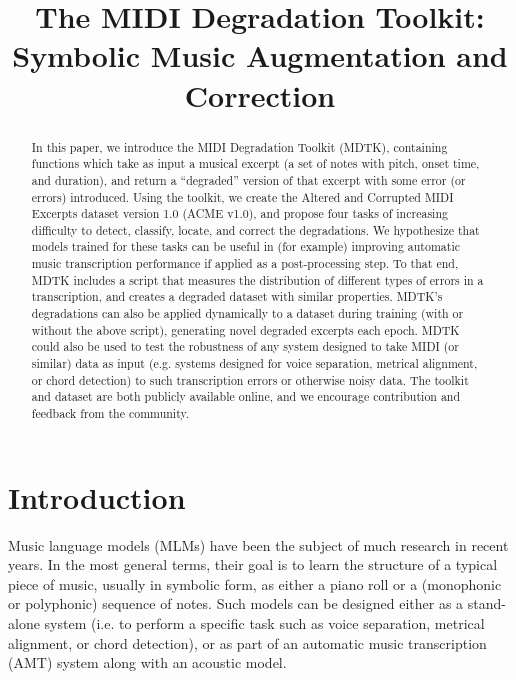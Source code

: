 \documentclass{article}
\title{The MIDI Degradation Toolkit:\\Symbolic Music Augmentation and Correction}
\begin{document}
%
\maketitle
%
\begin{abstract}
In this paper, we introduce the MIDI Degradation Toolkit (MDTK), containing functions which take as input a musical excerpt (a set of notes with pitch, onset time, and duration), and return a ``degraded'' version of that excerpt with some error (or errors) introduced. Using the toolkit, we create the Altered and Corrupted MIDI Excerpts dataset version 1.0 (ACME v1.0), and propose four tasks of increasing difficulty to detect, classify, locate, and correct the degradations. We hypothesize that models trained for these tasks can be useful in (for example) improving automatic music transcription performance if applied as a post-processing step. To that end, MDTK includes a script that measures the distribution of different types of errors in a transcription, and creates a degraded dataset with similar properties. MDTK's degradations can also be applied dynamically to a dataset during training (with or without the above script), generating novel degraded excerpts each epoch. MDTK could also be used to test the robustness of any system designed to take MIDI (or similar) data as input (e.g. systems designed for voice separation, metrical alignment, or chord detection) to such transcription errors or otherwise noisy data. The toolkit and dataset are both publicly available online, and we encourage contribution and feedback from the community.
\end{abstract}
%
\section{Introduction}
\label{sec:intro}
Music language models (MLMs) have been the subject of much research in recent years. In the most general terms, their goal is to learn the structure of a typical piece of music, usually in symbolic form, as either a piano roll or a (monophonic or polyphonic) sequence of notes. Such models can be designed either as a stand-alone system (i.e. to perform a specific task such as voice separation, metrical alignment, or chord detection), or as part of an automatic music transcription (AMT) system along with an acoustic model.
\end{document}
